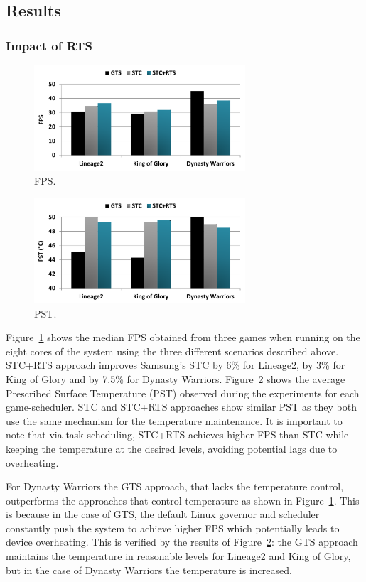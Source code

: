 \subsection{Results}
\subsubsection{Impact of RTS}
\begin{figure}[t]%
	\centering
	\includegraphics[width=0.7\textwidth]{figures/FPS.pdf}
	\caption{FPS.}
	\label{fig:FPS}
\end{figure}

\begin{figure}[t]%
	\centering
	\includegraphics[width=0.7\textwidth]{figures/PST.pdf}
	\caption{PST.}
	\label{fig:PST}
\end{figure}

Figure~\ref{fig:FPS} shows the median FPS obtained from three games when running on the eight cores of the system using the three different scenarios described above. 
STC+RTS approach improves Samsung's STC by 6\% for Lineage2, by 3\% for King of Glory and by 7.5\% for Dynasty Warriors. 
Figure~\ref{fig:PST} shows the average Prescribed Surface Temperature (PST) observed during the experiments for each game-scheduler.
STC and STC+RTS approaches show similar PST as they both use the same mechanism for the temperature maintenance.
It is important to note that via task scheduling, STC+RTS achieves higher FPS than STC while keeping the temperature at the desired levels, avoiding potential lags due to overheating.

For Dynasty Warriors the GTS approach, that lacks the temperature control, outperforms the approaches that control temperature as shown in Figure~\ref{fig:FPS}. 
This is because in the case of GTS, the default Linux governor and scheduler constantly push the system to achieve higher FPS which potentially leads to device overheating. 
This is verified by the results of Figure~\ref{fig:PST}: the GTS approach maintains the temperature in reasonable levels for Lineage2 and King of Glory, but in the case of Dynasty Warriors the temperature is increased.

